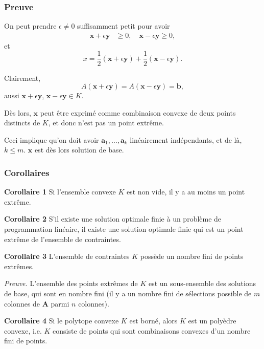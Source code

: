 \documentclass[usepdftitle=false]{beamer}
\def\ba{\boldsymbol{a}}
\def\bb{\boldsymbol{b}}
\def\bx{\boldsymbol{x}}
\def\by{\boldsymbol{y}}
\def\bA{\boldsymbol{A}}
\begin{document}
\begin{frame}
\frametitle{Preuve}

On peut prendre $\epsilon \ne 0$ suffisamment petit pour avoir
\begin{align*}
\bx + \epsilon \by &\geq 0, \quad
\bx - \epsilon \by \geq 0,
\end{align*}
et
\[
  x = \frac{1}{2}(\bx + \epsilon \by) + \frac{1}{2}(\bx - \epsilon \by).
\]

\mbox{}

Clairement,
\[
A(\bx + \epsilon \by) = A(\bx - \epsilon \by) = \bb,
\]
aussi $\bx + \epsilon \by$, $\bx - \epsilon \by \in K$.

\mbox{}

Dès lors, $\bx$ peut être exprimé comme combinaison convexe de deux points distincts de $K$, et donc n'est pas un point extrême.

\mbox{}

Ceci implique qu'on doit avoir $\ba_1,\ldots,\ba_k$ linéairement indépendants, et de là, $k \leq m$. $\bx$ est dès lors solution de base.
\end{frame}

\begin{frame}
\frametitle{Corollaires}

{\bf Corollaire 1} Si l'ensemble convexe $K$ est non vide, il y a au moins un point extrême.

\mbox{}

{\bf Corollaire 2} S'il existe une solution optimale finie à un problème de programmation linéaire, il existe une solution optimale finie qui est un point extrême de l'ensemble de contraintes.

\mbox{}

{\bf Corollaire 3} L'ensemble de contraintes $K$ possède un nombre fini de points extrêmes.

{\it Preuve.} L'ensemble des points extrêmes de $K$ est un sous-ensemble des solutions de base, qui sont en nombre fini (il y a un nombre fini de sélections possible de $m$ colonnes de $\bA$ parmi $n$ colonnes).

\mbox{}

{\bf Corollaire 4} 
Si le polytope convexe $K$ est borné, alors $K$ est un polyèdre convexe, i.e. $K$ consiste de points qui sont combinaisons convexes d'un nombre fini de points.
\end{frame}
\end{document}
